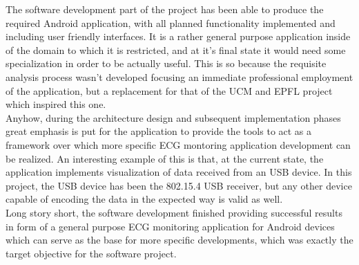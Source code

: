		The software development part of the project has been able to produce the required Android application, with all planned functionality implemented and including user friendly interfaces. It is a rather general purpose application inside of the domain to which it is restricted, and at it's final state it would need some specialization in order to be actually useful. This is so because the requisite analysis process wasn't developed focusing an immediate professional employment of the application, but a replacement for that of the UCM and EPFL project which inspired this one. \\

		Anyhow, during the architecture design and subsequent implementation phases great emphasis is put for the application to provide the tools to act as a framework over which more specific ECG montoring application development can be realized. An interesting example of this is that, at the current state, the application implements visualization of data received from an USB device. In this project, the USB device has been the 802.15.4 USB receiver, but any other device capable of encoding the data in the expected way is valid as well.\\

		Long story short, the software development finished providing successful results in form of a general purpose ECG monitoring application for Android devices which can serve as the base for more specific developments, which was exactly the target objective for the software project.
